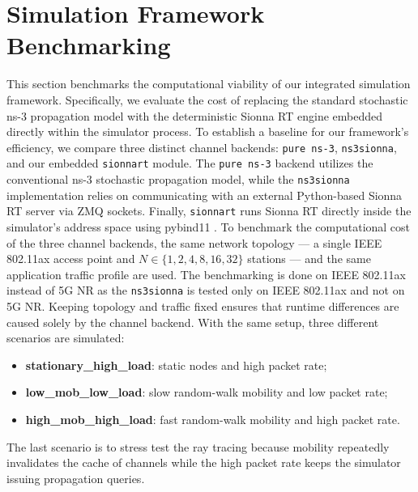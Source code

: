 \section{Simulation Framework Benchmarking}
\label{sec:results-part1-runtime-scaling}

This section benchmarks the computational viability of our integrated simulation framework. Specifically, we evaluate the cost of replacing the standard stochastic ns-3 propagation model with the deterministic Sionna RT engine embedded directly within the simulator process.
To establish a baseline for our framework's efficiency, we compare three distinct channel backends: \texttt{pure ns-3}, \texttt{ns3sionna}, and our embedded \texttt{sionnart} module.
The \texttt{pure ns-3} backend utilizes the conventional ns-3 stochastic propagation model,
while the \texttt{ns3sionna} \cite{ns3sionna} implementation relies on communicating with an external Python-based Sionna RT server via ZMQ sockets.
Finally, \texttt{sionnart} runs Sionna RT directly inside the simulator's address space using pybind11 \cite{sionna,sionnart,pybind11}.
To benchmark the computational cost of the three channel backends, the same network topology — a single IEEE 802.11ax access point and $N\in\{1,2,4,8,16,32\}$ stations — and the same application traffic profile are used.
The benchmarking is done on IEEE 802.11ax instead of 5G NR as the \texttt{ns3sionna} \cite{ns3sionna} is tested only on IEEE 802.11ax and not on 5G NR.
Keeping topology and traffic fixed ensures that runtime differences are caused solely by the channel backend.
With the same setup, three different scenarios are simulated:
\begin{itemize}
    \item \textbf{stationary\_high\_load}: static nodes and high packet rate;
    \item \textbf{low\_mob\_low\_load}: slow random-walk mobility and low packet rate;
    \item \textbf{high\_mob\_high\_load}: fast random-walk mobility and high packet rate.
\end{itemize}
The last scenario is to stress test the ray tracing because mobility repeatedly invalidates the cache of channels while the high packet rate keeps the simulator issuing propagation queries.






